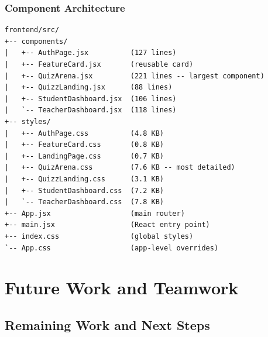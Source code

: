 \documentclass[12pt,a4paper]{article}
\begin{document}
\subsubsection{Component Architecture}

\begin{lstlisting}
frontend/src/
+-- components/
|   +-- AuthPage.jsx          (127 lines)
|   +-- FeatureCard.jsx       (reusable card)
|   +-- QuizArena.jsx         (221 lines -- largest component)
|   +-- QuizzLanding.jsx      (88 lines)
|   +-- StudentDashboard.jsx  (106 lines)
|   `-- TeacherDashboard.jsx  (118 lines)
+-- styles/
|   +-- AuthPage.css          (4.8 KB)
|   +-- FeatureCard.css       (0.8 KB)
|   +-- LandingPage.css       (0.7 KB)
|   +-- QuizArena.css         (7.6 KB -- most detailed)
|   +-- QuizzLanding.css      (3.1 KB)
|   +-- StudentDashboard.css  (7.2 KB)
|   `-- TeacherDashboard.css  (7.8 KB)
+-- App.jsx                   (main router)
+-- main.jsx                  (React entry point)
+-- index.css                 (global styles)
`-- App.css                   (app-level overrides)
\end{lstlisting}

\section{Future Work and Teamwork}

\subsection{Remaining Work and Next Steps}
\end{document}
